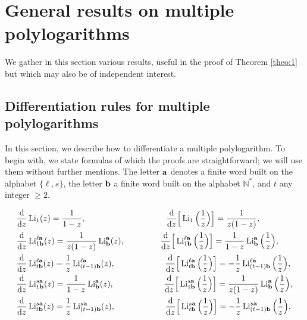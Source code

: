 \documentclass[reqno,12pt]{amsart}
\numberwithin{equation}{section}
\theoremstyle{remark}
\def\li{\operatorname{Li}}
\def\dd{\textup{d}}
\begin{document}
\section{General results on multiple  polylogarithms}\label{sec:technicalities}

We gather in this section various results, useful in the proof of Theorem \ref{theo:1} 
but which may also be of independent interest.


\subsection{Differentiation rules for multiple polylogarithms}\label{sec:diff}

In this section, we describe how to differentiate a multiple polylogarithm. To begin with, 
we state formulas of which the proofs 
are straightforward; we will use them without further mentions.
The letter ${\bf a}$ denotes a finite 
word built on the alphabet $\{\ell,s\}$, the letter ${\bf b}$ a   finite word built on the 
alphabet $\mathbb{N}^{*}$,  and $t$ any integer $\ge 2$.


\begin{align*}
\frac{\dd }{\dd z}& \li_1(z)= \frac{1}{1-z}, \hspace{3.4cm} \frac{\dd }{\dd z}
\Big[ \li_1\Big(\frac1z\Big) \Big]= \frac{1}{z(1-z)},
\\
\frac{\dd }{\dd z}& \li_{1{\bf b}}^{\ell{\bf a}}(z)=\frac{1}{z(1-z)} 
\li_{{\bf b}}^{{\bf a}}(z), \hspace{1.5cm}
\frac{\dd }{\dd z}\Big[  \li_{1{\bf b}}^{\ell{\bf a}}\Big(\frac1z\Big) \Big]=\frac{1}{1-z} 
\li_{{\bf b}}^{{\bf a}}\Big(\frac1z\Big),
\\
\frac{\dd }{\dd z}& \li_{t{\bf b}}^{\ell{\bf a}}(z)=\frac{1}{z} 
\li_{(t-1){\bf b}}^{\ell{\bf a}}(z), \hspace{2.1cm} 
\frac{\dd }{\dd z}\Big[  \li_{t{\bf b}}^{\ell{\bf a}}\Big(\frac1z\Big) \Big]=-
\frac{1}{z} \li_{(t-1){\bf b}}^{\ell{\bf a}}\Big(\frac1z\Big),
\\
\frac{\dd }{\dd z}& \li_{1{\bf b}}^{s{\bf a}}(z)=\frac{1}{1-z} 
\li_{{\bf b}}^{{\bf a}}(z), \hspace{2.1cm} 
\frac{\dd }{\dd z}\Big[ \li_{1{\bf b}}^{s{\bf a}}\Big(\frac1z\Big) \Big]=\frac{1}{z(1-z)} 
\li_{{\bf b}}^{{\bf a}}\Big(\frac1z\Big),
\\
\frac{\dd }{\dd z}& \li_{t{\bf b}}^{s{\bf a}}(z)=\frac{1}{z} 
\li_{(t-1){\bf b}}^{s{\bf a}}(z), \hspace{2.1cm} 
\frac{\dd }{\dd z}\Big[  \li_{t{\bf b}}^{s{\bf a}}\Big(\frac1z\Big) \Big]=-
\frac{1}{z} \li_{(t-1){\bf b}}^{s{\bf a}}\Big(\frac1z\Big).
\end{align*}
\end{document}
